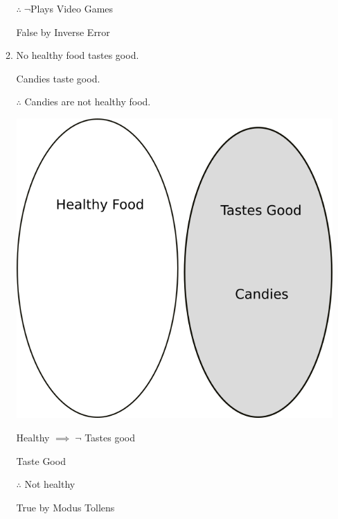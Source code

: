 \documentclass[12pt,letterpaper,titlepage]{article}
\begin{document}
\begin{raggedright}
\begin{enumerate}
\begin{enumerate}[label=(\alph*)]
	  $\therefore\;\neg$Plays Video Games

	  False by Inverse Error
                    
    \item No healthy food tastes good. 

    	  Candies taste good. 
    	  
    	  $\therefore$ Candies are not healthy food.
    	  
          \includegraphics[width=.375\textwidth, height=\textheight, keepaspectratio=true]{hw3q8b}

		  Healthy $\implies\;\neg$ Tastes good

		  Taste Good
		  
		  $\therefore$ Not healthy
		  
		  True by Modus Tollens

  \end{enumerate}

\end{enumerate}
\end{raggedright}
\end{document}
